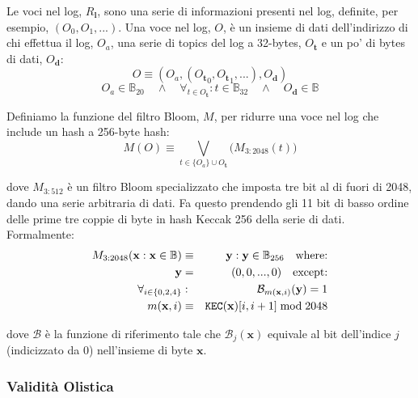 \documentclass[9pt,oneside]{amsart}
\begin{document}
\begin{multicols}{2}

Le voci nel log, $R_\mathbf{l}$, sono una serie di informazioni presenti nel log, definite, per esempio, $(O_0, O_1, ...)$. Una voce nel log, $O$, è un insieme di dati dell'indirizzo di chi effettua il log, $O_a$, una serie di topics del log a 32-bytes, $O_\mathbf{t}$ e un po' di bytes di dati, $O_\mathbf{d}$:
\begin{equation}
O \equiv (O_a, ({O_\mathbf{t}}_0, {O_\mathbf{t}}_1, ...), O_\mathbf{d})
\end{equation}
\begin{equation}
O_a \in \mathbb{B}_{20} \quad \wedge \quad \forall_{t \in O_\mathbf{t}}: t \in \mathbb{B}_{32} \quad \wedge \quad O_\mathbf{d} \in \mathbb{B}
\end{equation}

Definiamo la funzione del filtro Bloom, $M$, per ridurre una voce nel log che include un hash a 256-byte hash:
\begin{equation}
M(O) \equiv \bigvee_{t \in \{O_a\} \cup O_\mathbf{t}} \big( M_{3:2048}(t) \big)
\end{equation}

dove $M_{3:512}$ è un filtro Bloom specializzato che imposta tre bit al di fuori di 2048, dando una serie arbitraria di dati. Fa questo prendendo gli 11 bit di basso ordine delle prime tre coppie di byte in hash Keccak 256 della serie di dati. Formalmente:
\begin{eqnarray}
M_{3:2048}(\mathbf{x}: \mathbf{x} \in \mathbb{B}) & \equiv & \mathbf{y}: \mathbf{y} \in \mathbb{B}_{256} \quad \text{where:}\\
\mathbf{y} & = & (0, 0, ..., 0) \quad \text{except:}\\
\forall_{i \in \{0, 2, 4\}}&:& \mathcal{B}_{m(\mathbf{x}, i)}(\mathbf{y}) = 1\\
m(\mathbf{x}, i) &\equiv& \mathtt{\tiny KEC}(\mathbf{x})[i, i + 1] \bmod 2048
\end{eqnarray}

dove $\mathcal{B}$ è la funzione di riferimento tale che $\mathcal{B}_j(\mathbf{x})$ equivale al bit dell'indice $j$ (indicizzato da 0) nell'insieme di byte $\mathbf{x}$.

\subsubsection{Validità Olistica}


\end{multicols}
\end{document}
